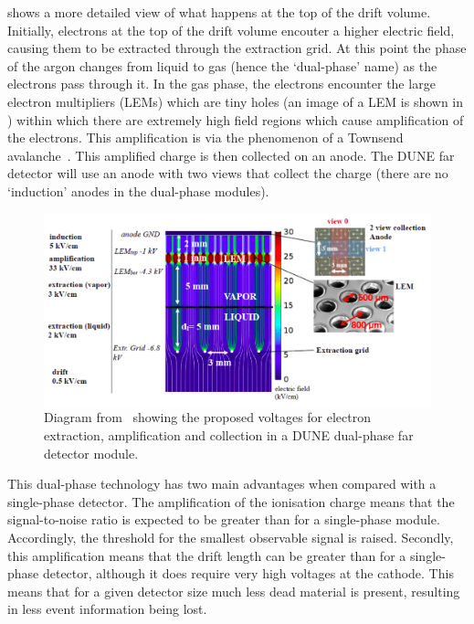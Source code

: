  shows a more detailed view of what happens at the top of the drift volume.
Initially, electrons at the top of the drift volume encouter a higher electric field, causing them to be extracted through the extraction grid.
At this point the phase of the argon changes from liquid to gas (hence the `dual-phase' name) as the electrons pass through it.
In the gas phase, the electrons encounter the large electron multipliers (LEMs) which are tiny holes (an image of a LEM is shown in ) within which there are extremely high field regions which cause amplification of the electrons.
This amplification is via the phenomenon of a Townsend avalanche~\cite{townsendAvalanche}.
This amplified charge is then collected on an anode.
The DUNE far detector will use an anode with two views that collect the charge (there are no `induction' anodes in the dual-phase modules).

\begin{figure}
  \centering
  \includegraphics[width=.8\linewidth]{files/figures/dune_detector/dualPhaseVoltage}
  \caption[Diagram showing electric fields at different near the DUNE dual-phase anode]{Diagram from~\cite{tdrVol1} showing the proposed voltages for electron extraction, amplification and collection in a DUNE dual-phase far detector module.}
  \label{fig:dualPhaseVoltage}
\end{figure}

This dual-phase technology has two main advantages when compared with a single-phase detector.
The amplification of the ionisation charge means that the signal-to-noise ratio is expected to be greater than for a single-phase module.
Accordingly, the threshold for the smallest observable signal is raised.
Secondly, this amplification means that the drift length can be greater than for a single-phase detector, although it does require very high voltages at the cathode.
This means that for a given detector size much less dead material is present, resulting in less event information being lost.

